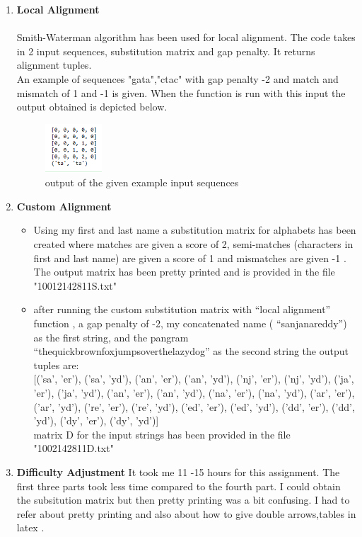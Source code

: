 \documentclass[12pt, oneside]{article}   	%
\begin{document}
\begin{enumerate}
\item 
\textbf{ Local Alignment }\\
\\
Smith-Waterman algorithm has been used for local alignment. The code takes in 2 input sequences, substitution matrix and gap penalty. It returns alignment tuples.\\
An example of sequences "gata","ctac" with gap penalty -2 and match and mismatch of 1 and -1 is given. When the function is run with this input the output obtained is depicted below.\\ 

\newpage
\begin{figure}[H]
    \centering
    \includegraphics[width=0.2\textwidth]{localegop}
    \caption{\footnotesize{output of the given example input sequences}}
    \label{fig:mesh1}
\end{figure}

\item 
\textbf{ Custom Alignment }
\begin{itemize}
\item Using my first and last name a substitution matrix for alphabets has been created where matches are given a score of 2, semi-matches (characters in first and last name) are given a score of 1 and mismatches are given -1 . The output matrix has been pretty printed and is provided in the file "10012142811S.txt"
\item after running the custom substitution matrix with “local alignment” function , a gap penalty of -2, my concatenated name ( “sanjanareddy”) as the first string, and the pangram “thequickbrownfoxjumpsoverthelazydog” as the second string the output tuples are: \\
{[('sa', 'er'),  ('sa', 'yd'),  ('an', 'er'), ('an', 'yd'), ('nj', 'er'), ('nj', 'yd'), ('ja', 'er'), ('ja', 'yd'), ('an', 'er'), ('an', 'yd'),  ('na', 'er'), ('na', 'yd'), ('ar', 'er'), ('ar', 'yd'), ('re', 'er'), ('re', 'yd'), ('ed', 'er'), ('ed', 'yd'), ('dd', 'er'), ('dd', 'yd'), ('dy', 'er'), ('dy', 'yd')]}\\
matrix D for the input strings has been provided in the file "1002142811D.txt"




\end{itemize}
\item
\textbf{ Difficulty Adjustment }
It took me 11 -15 hours for this assignment. The first three parts took less time compared to the fourth part. I could obtain the subsitution matrix but then pretty printing was a bit confusing. I had to refer about pretty printing and also about how to give double arrows,tables  in latex . 




\end{enumerate}
\end{document}
